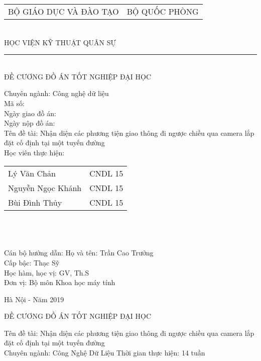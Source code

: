 \documentclass[12pt,twoside,a4paper]{article}
\begin{document}
\begin{center}
\vfill
\begin{tabular*}{0.8\linewidth}{@{\extracolsep{\fill}}cc}
	\large BỘ GIÁO DỤC VÀ ĐÀO TẠO  & \large BỘ QUỐC PHÒNG \\
\end{tabular*}
\\
\large HỌC VIỆN KỸ THUẬT QUÂN SỰ
\\
\rule{200px}{1px}\\
ĐỀ CƯƠNG ĐỒ ÁN TỐT NGHIỆP ĐẠI HỌC \\

\end{center}
\vfill
Chuyên ngành: Công nghệ dữ liệu\\
Mã số:\\
Ngày giao đồ án:\\
Ngày nộp đồ án:\\
Tên đề tài: Nhận diện các phương tiện giao thông đi ngược chiều qua camera lắp đặt cố định tại một tuyến đường\\
Học viên thực hiện:
\smallbreak
\begin{tabularx}{\linewidth}{l l}
	 Lý Văn Chản  & CNDL 15\\
	 Nguyễn Ngọc Khánh  & CNDL 15\\
	 Bùi Đình Thủy  &  CNDL 15\\
\end{tabularx}\\\\\\
Cán bộ hướng dẫn:
Họ và tên: Trần Cao Trưởng\\
Cấp bậc: Thạc Sỹ\\
Học hàm, học vị: GV, Th.S\\
Đơn vị: Bộ môn Khoa học máy tính\\

\begin{center}
Hà Nội - Năm 2019
\end{center}

\vfill
\pagebreak



\begin{center}
ĐỀ CƯƠNG ĐỒ ÁN TỐT NGHIỆP ĐẠI HỌC
\end{center}
Tên đề tài: Nhận diện các phương tiện giao thông đi ngược chiều qua camera lắp đặt cố định tại một tuyến đường\\
Chuyên ngành: Công Nghệ Dữ Liệu
Thời gian thực hiện: 14 tuần
\end{document}
